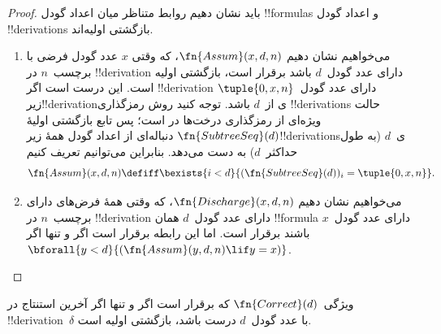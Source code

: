\documentclass[../../../include/open-logic-section]{subfiles}
\begin{document}
\begin{proof}
  باید نشان دهیم روابط متناظر میان اعداد گودل !!{formula}s و اعداد
  گودل !!{derivation}s بازگشتی اولیه‌اند.
  \begin{enumerate}
  \item می‌خواهیم نشان دهیم $\fn{Assum}(x,d,n)$، که وقتی $x$ عدد
    گودل فرضی با برچسب~$n$ در !!{derivation} دارای عدد گودل~$d$ باشد
    برقرار است، بازگشتی اولیه است. این درست است اگر !!{derivation} دارای
    عدد گودل~$\tuple{0,x,n}$ زیر!!{derivation}ی از~$d$ باشد. توجه کنید
    روش رمزگذاری !!{derivation}s حالت ویژه‌ای از رمزگذاری درخت‌ها در
     است؛ پس تابع بازگشتی اولیهٔ
    $\fn{SubtreeSeq}(d)$ دنباله‌ای از اعداد گودل همهٔ
    زیر!!{derivation}sی~$d$ (به طول حداکثر~$d$) به دست می‌دهد. بنابراین
    می‌توانیم تعریف کنیم
    \[
    \fn{Assum}(x, d, n) \defiff \bexists{i<d}{(\fn{SubtreeSeq}(d))_i =
      \tuple{0, x, n}}.
    \]
  \item می‌خواهیم نشان دهیم $\fn{Discharge}(x,d,n)$، که وقتی همهٔ
    فرض‌های دارای برچسب~$n$ در !!{derivation} دارای عدد گودل~$d$ همان
    !!{formula} دارای عدد گودل~$x$ باشند برقرار است. اما این رابطه
    برقرار است اگر و تنها اگر
    $\bforall{y<d}{(\fn{Assum}(y,d,n)\lif y=x)}$.
  \end{enumerate}
\end{proof}

\begin{prop}
  ویژگی~$\fn{Correct}(d)$ که برقرار است اگر و تنها اگر آخرین استنتاج
  در !!{derivation}~$\delta$ با عدد گودل~$d$ درست باشد، بازگشتی اولیه است.
\end{prop}
\end{document}
